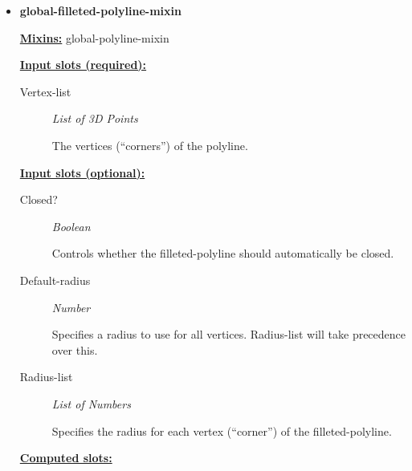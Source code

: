 \documentclass [11pt]{book}
\begin{document}
\begin{itemize}
\item {}
\label{prim:global-filleted-polyline-mixin}
\textbf{global-filleted-polyline-mixin}


\textbf{
\underline{Mixins:}} global-polyline-mixin







\textbf{
\underline{Input slots (required):}}

\begin{description}

\item [Vertex-list]
\emph{List of 3D Points}

 The vertices (``corners'') of the polyline.




\end{description}






\textbf{
\underline{Input slots (optional):}}

\begin{description}

\item [Closed?]
\emph{Boolean}

 Controls whether the filleted-polyline should automatically be closed.




\item [Default-radius]
\emph{Number}

 Specifies a radius to use for all vertices. Radius-list will take precedence over this.




\item [Radius-list]
\emph{List of Numbers}

 Specifies the radius for each vertex (``corner'') of the filleted-polyline.




\end{description}






\textbf{
\underline{Computed slots:}}

\begin{description}


\end{description}
\end{itemize}
\end{document}
